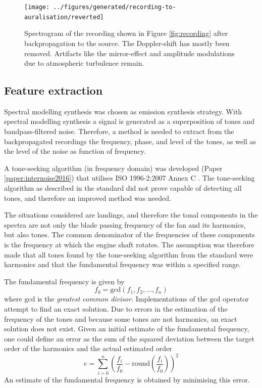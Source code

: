 \begin{figure}[H]
  \centering
  \texttt{[image: ../figures/generated/recording-to-auralisation/reverted]}
  \caption{Spectrogram of the recording shown in Figure \ref{fig:recording} after backpropagation to the source. The Doppler-shift has mostly been removed. Artifacts like the mirror-effect and amplitude modulations due to atmospheric turbulence remain.}
  \label{fig:backpropagated}
\end{figure}

\subsection{Feature extraction}
Spectral modelling synthesis was chosen as emission synthesis strategy. With
spectral modelling synthesis a signal is generated as a superposition of tones
and bandpass-filtered noise.
Therefore, a method is needed to extract from the backpropagated recordings the
frequency, phase, and level of the tones, as well as the level of the noise as
function of frequency.

A tone-seeking algorithm (in frequency domain) was developed (Paper \ref{paper:internoise2016})
that utilises ISO 1996-2:2007 Annex C \cite{ISO1996-2_2007}. The tone-seeking
algorithm as described in the standard did not prove capable of detecting all
tones, and therefore an improved method was needed.

The situations considered are landings, and therefore the tonal components
in the spectra are not only the blade passing frequency of the fan and its
harmonics, but also  tones. The common denominator of the frequencies of
these components is the frequency at which the engine shaft rotates.
The assumption was therefore made that all tones found by the
tone-seeking algorithm from the standard were harmonics and that the fundamental
frequency was within a specified range.

The fundamental frequency is given by
\begin{equation}
 f_{0} = \mathrm{gcd}\left(f_1, f_2, \dots, f_n \right)
\end{equation}
where $\mathrm{gcd}$ is the \emph{greatest common divisor}.
Implementations of the $\mathrm{gcd}$ operator attempt to find an exact solution.
Due to errors in the estimation of the frequency of the tones and because some tones are
not harmonics, an exact solution does not exist. Given an initial estimate of
the fundamental frequency, one could define an error as the sum of the squared
deviation between the target order of the harmonics and the actual estimated
order
\begin{equation}
 e = \sum_{i=0}^{n} \left( \frac{f_i}{f_0} - \mathrm{round}\left(\frac{f_i}{f_0}\right) \right)^2
\end{equation}
An estimate of the fundamental frequency is obtained by minimising this error.

